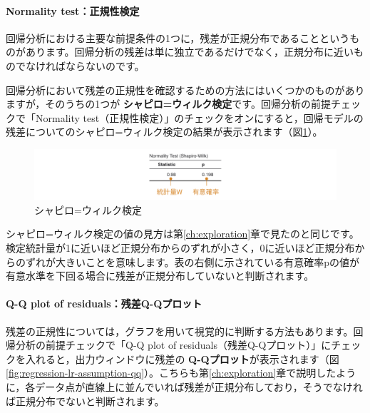 \documentclass[
  12pt,
  a5jpaper,
  lualatex, ja=standard]{bxjsbook}
\renewcommand{\emph}[1]{\textbf{\color{emph} #1}}
\begin{document}
\hypertarget{normality-testux6b63ux898fux6027ux691cux5b9a-1}{%
\paragraph*{Normality test：正規性検定}\label{normality-testux6b63ux898fux6027ux691cux5b9a-1}}

回帰分析における主要な前提条件の1つに，残差が正規分布であることというものがあります。回帰分析の残差は単に独立であるだけでなく，正規分布に近いものでなければならないのです。

回帰分析において残差の正規性を確認するための方法にはいくつかのものがありますが，そのうちの1つが\emph{シャピロ=ウィルク検定}です。回帰分析の前提チェックで「Normality test（正規性検定）」のチェックをオンにすると，回帰モデルの残差についてのシャピロ=ウィルク検定の結果が表示されます（図\ref{fig:regression-lr-assumption-sw}）。

\begin{figure}[!ht]

{\centering \includegraphics[width=1\linewidth]{images/regression/lr-assumption-sw} 

}

\caption{シャピロ=ウィルク検定}\label{fig:regression-lr-assumption-sw}
\end{figure}

シャピロ=ウィルク検定の値の見方は第\ref{ch:exploration}章で見たのと同じです。検定統計量が1に近いほど正規分布からのずれが小さく，0に近いほど正規分布からのずれが大きいことを意味します。表の右側に示されている有意確率pの値が有意水準を下回る場合に残差が正規分布していないと判断されます。

\hypertarget{q-q-plot-of-residualsux6b8bux5deeq-qux30d7ux30edux30c3ux30c8}{%
\paragraph*{Q-Q plot of residuals：残差Q-Qプロット}\label{q-q-plot-of-residualsux6b8bux5deeq-qux30d7ux30edux30c3ux30c8}}

残差の正規性については，グラフを用いて視覚的に判断する方法もあります。回帰分析の前提チェックで「Q-Q plot of residuals（残差Q-Qプロット）」にチェックを入れると，出力ウィンドウに残差の\emph{Q-Qプロット}が表示されます（図\ref{fig:regression-lr-assumption-qq}）。こちらも第\ref{ch:exploration}章で説明したように，各データ点が直線上に並んでいれば残差が正規分布しており，そうでなければ正規分布でないと判断されます。
\end{document}
